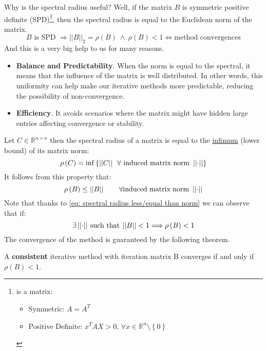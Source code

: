 \begin{itemize}
\begin{itemize}
        Why is the spectral radius useful? Well, if the matrix $B$ is symmetric positive definite (SPD)\footnote{ is a matrix: \begin{itemize}
            \item Symmetric: $A = A^{T}$
            \item Positive Definite: $x^{T}AX > 0$, $\forall x \in \mathbb{R}^{n} \setminus \left\{0\right\}$
        \end{itemize}}, then the spectral radius is equal to the Euclidean norm of the matrix.
        \begin{equation*}
            B \text{ is SPD } \Rightarrow {\left|\left|B\right|\right|}_{2} = \rho\left(B\right) \: \land \: \rho\left(B\right) < 1 \iff \text{method convergences}
        \end{equation*}
        And this is a very big help to us for many reasons.
        \begin{itemize}
            \item \textbf{Balance and Predictability}. When the norm is equal to the spectral, it means that the influence of the matrix is well distributed. In other words, this uniformity can help make our iterative methods more predictable, reducing the possibility of non-convergence.

            \item \textbf{Efficiency}. It avoids scenarios where the matrix might have hidden large entries affecting convergence or stability.
        \end{itemize}   
    \end{itemize}
\end{itemize}
\newpage
\noindent
Let $C \in \mathbb{R}^{n \times n}$ then the spectral radius of a matrix is equal to the \href{https://en.wikipedia.org/wiki/Infimum_and_supremum}{infimum} (lower bound) of its matrix norm:
\begin{equation}
    \rho\left(C\right) = \mathrm{inf}\left\{ \left|\left|C\right|\right| \:\: \forall \text{ induced matrix norm }\left|\left|\cdot\right|\right|\right\}
\end{equation}
It follows from this property that:
\begin{equation}\label{eq: spectral radius less/equal than norm}
    \rho\left(B\right) \le \left|\left|B\right|\right| \hspace{2em} \forall \text{induced matrix norm } \left|\left|\cdot\right|\right|
\end{equation}
Note that thanks to \ref{eq: spectral radius less/equal than norm} we can observe that if:
\begin{equation*}
    \exists \left|\left|\cdot\right|\right| \: \text{such that} \: \left|\left|B\right|\right| < 1 \Longrightarrow \rho\left(B\right) < 1
\end{equation*}
The convergence of the method is guaranteed by the following theorem.

\highspace
\begin{theorem}
    A \textbf{consistent} iterative method with iteration matrix B converges if and only if $\rho\left(B\right) < 1$.
\end{theorem}
